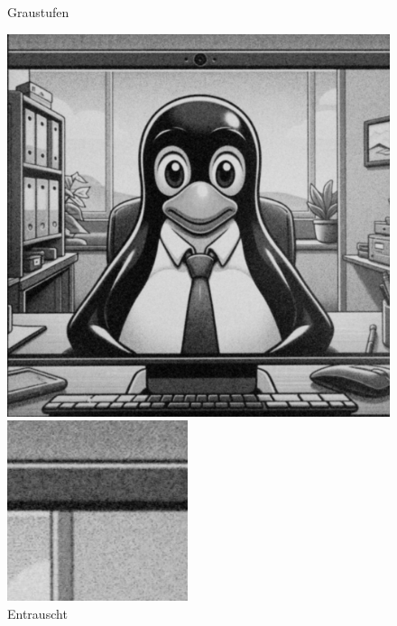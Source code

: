 \documentclass[course=erap]{aspdoc}
\begin{document}
\begin{figure}
\begin{minipage}[t]{.33\linewidth}
        \caption{Graustufen}
        \label{fig:graustufen}
    \end{minipage}%
    \begin{minipage}[t]{.33\linewidth}
        \centering
        \includegraphics[width=\linewidth]{Image/Sample_VideoCall/denoisedvideocall_simd.png}
        \caption{Entrauscht}
        \label{fig:entrauscht}
    \end{minipage}
    \centering
    \begin{minipage}[t]{.33\linewidth}
        \centering
        \includegraphics[width=\linewidth]{Image/Sample_VideoCall/noisyvideocall_detail.png}

\end{minipage}
\end{figure}
\end{document}
